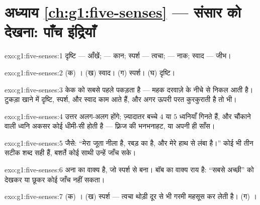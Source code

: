 \section*{अध्याय \ref{ch:g1:five-senses} --- संसार को देखना: पाँच इंद्रियाँ}

\begin{solution}{exo:g1:five-senses:1}
दृष्टि --- आँखें;  --- कान; स्पर्श --- त्वचा;  --- नाक;
स्वाद --- जीभ।
\end{solution}

\begin{solution}{exo:g1:five-senses:2}
(क) । (ख) स्वाद। (ग) स्पर्श। (घ) दृष्टि।
\end{solution}

\begin{solution}{exo:g1:five-senses:3}
केक को सबसे पहले  पकड़ता है --- महक दरवाज़े के नीचे से निकल आती
है। टुकड़ा खाने में दृष्टि, स्पर्श,  और स्वाद काम आते हैं, और
अगर ऊपरी परत कुरकुराती है तो  भी।
\end{solution}

\begin{solution}{exo:g1:five-senses:4}
उत्तर अलग-अलग होंगे; ज़्यादातर बच्चे $4$ या $5$ ध्वनियाँ गिनते हैं,
और चौंकाने वाली ध्वनि अकसर कोई धीमी-सी होती है --- फ़्रिज की भनभनाहट,
या अपनी ही साँस।
\end{solution}

\begin{solution}{exo:g1:five-senses:5}
जैसे: ``मेरा जूता नीला है, रबड़ का है, और मेरे हाथ से लंबा है।'' कोई
भी तीन सटीक शब्द सही हैं, बशर्ते कोई साथी उन्हें जाँच सके।
\end{solution}

\begin{solution}{exo:g1:five-senses:6}
अना का वाक्य  है, जो स्पर्श से बना। बॉब का वाक्य राय है:
``सबसे अच्छी'' को देखकर या छूकर कोई जाँच नहीं सकता।
\end{solution}

\begin{solution}{exo:g1:five-senses:7}
(क) । (ख) स्पर्श --- त्वचा थोड़ी दूर से भी गरमी महसूस कर लेती
है। (ग) ।
\end{solution}

